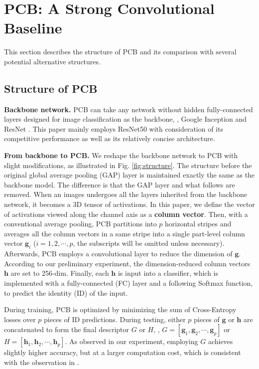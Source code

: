 \documentclass[10pt,twocolumn,letterpaper]{article}
\begin{document}
\section{PCB: A Strong Convolutional Baseline}\label{sec:network}
This section describes the structure of PCB and its comparison with several potential alternative structures.

\subsection{Structure of PCB}
\textbf{Backbone network.} PCB can take any network without hidden fully-connected layers designed for image classification as the backbone, \eg, Google Inception \cite{Szegedy2016Inception} and ResNet \cite{DBLP:conf/cvpr/HeZRS16}. 
This paper mainly employs ResNet50 with consideration of its competitive performance as well as its relatively concise architecture. %


\textbf{From backbone to PCB.} We reshape the backbone network to PCB with slight modifications, as illustrated in Fig. \ref{fig:structure}. The structure before the original global average pooling  (GAP) layer is maintained exactly the same as the backbone model. The difference is that the GAP layer and what follows are removed. When an images undergoes all the layers inherited from the backbone network, it becomes a 3D tensor  of activations. In this paper, we define the vector of activations viewed along the channel axis as a \textbf{column vector}. 
Then, with a conventional average pooling, PCB partitions  into $p$ horizontal stripes and averages all the column vectors in a same stripe into a single part-level column vector $\bm g_i$ ($i=1,2,\cdots, p$, the subscripts will be omitted unless necessary). %
Afterwards, PCB employs a convolutional layer to reduce the dimension of $\bm{g}$. According to our preliminary experiment, the dimension-reduced column vectors $\bm{h}$ are set to 256-dim. Finally, each $\bm{h}$ is input into a classifier, which is implemented with a fully-connected (FC) layer and a following Softmax function, to predict the identity (ID) of the input. 

During training, PCB is optimized by minimizing the sum of Cross-Entropy losses over $p$ pieces of ID predictions. During testing, either $p$ pieces of $\bm{g}$ or $\bm{h}$ are concatenated to form the final descriptor $G$ or $H$, \ie, $G = [\bm{g}_1,\bm{g}_2,\cdots,\bm{g}_p]$ or $H = [\bm{h}_1,\bm{h}_2,\cdots,\bm{h}_p]$. As observed in our experiment, employing $G$ achieves slightly higher accuracy, but at a larger computation cost, which is consistent with the observation in \cite{Sun2017SVDNet}. 
\end{document}
